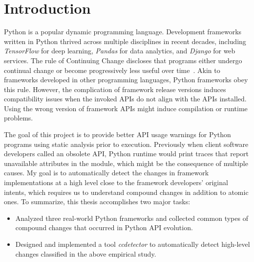 \chapter{Introduction}
\label{chap:introduction}

Python is a popular dynamic programming language. Development frameworks written in Python thrived across multiple disciplines in recent decades, including \textit{TensorFlow} for deep learning, \textit{Pandas} for data analytics, and \textit{Django} for web services. The rule of Continuing Change discloses that programs either undergo continual change or become progressively less useful over time~\cite{evo-laws}. Akin to frameworks developed in other programming languages, Python frameworks obey this rule. However, the complication of framework release versions induces compatibility issues when the invoked APIs do not align with the APIs installed. Using the wrong version of framework APIs might induce compilation or runtime problems.

The goal of this project is to provide better API usage warnings for Python programs using static analysis prior to execution. Previously when client software developers called an obsolete API, Python runtime would print traces that report unavailable attributes in the module, which might be the consequence of multiple causes. My goal is to automatically detect the changes in framework implementations at a high level close to the framework developers' original intents, which requires us to understand compound changes in addition to atomic ones.
To summarize, this thesis accomplishes two major tasks:

\begin{itemize}
  \item Analyzed three real-world Python frameworks and collected common types of compound changes that occurred in Python API evolution.
  \item Designed and implemented a tool \textit{ccdetector} to automatically detect high-level changes classified in the above empirical study.
\end{itemize}
